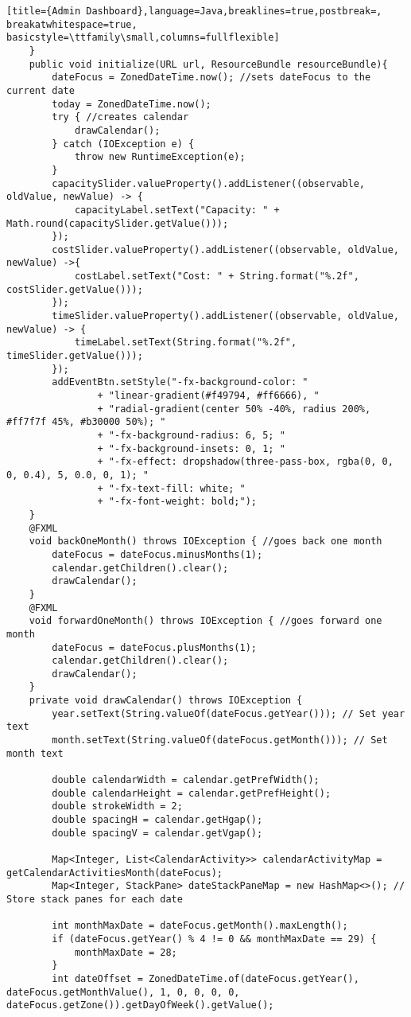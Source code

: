 \begin{lstlisting}[title={Admin Dashboard},language=Java,breaklines=true,postbreak=, breakatwhitespace=true, basicstyle=\ttfamily\small,columns=fullflexible]
    }
    public void initialize(URL url, ResourceBundle resourceBundle){
        dateFocus = ZonedDateTime.now(); //sets dateFocus to the current date
        today = ZonedDateTime.now();
        try { //creates calendar
            drawCalendar();
        } catch (IOException e) {
            throw new RuntimeException(e);
        }
        capacitySlider.valueProperty().addListener((observable, oldValue, newValue) -> {
            capacityLabel.setText("Capacity: " + Math.round(capacitySlider.getValue()));
        });
        costSlider.valueProperty().addListener((observable, oldValue, newValue) ->{
            costLabel.setText("Cost: " + String.format("%.2f", costSlider.getValue()));
        });
        timeSlider.valueProperty().addListener((observable, oldValue, newValue) -> {
            timeLabel.setText(String.format("%.2f", timeSlider.getValue()));
        });
        addEventBtn.setStyle("-fx-background-color: "
                + "linear-gradient(#f49794, #ff6666), "
                + "radial-gradient(center 50% -40%, radius 200%, #ff7f7f 45%, #b30000 50%); "
                + "-fx-background-radius: 6, 5; "
                + "-fx-background-insets: 0, 1; "
                + "-fx-effect: dropshadow(three-pass-box, rgba(0, 0, 0, 0.4), 5, 0.0, 0, 1); "
                + "-fx-text-fill: white; "
                + "-fx-font-weight: bold;");
    }
    @FXML
    void backOneMonth() throws IOException { //goes back one month
        dateFocus = dateFocus.minusMonths(1);
        calendar.getChildren().clear();
        drawCalendar();
    }
    @FXML
    void forwardOneMonth() throws IOException { //goes forward one month
        dateFocus = dateFocus.plusMonths(1);
        calendar.getChildren().clear();
        drawCalendar();
    }
    private void drawCalendar() throws IOException {
        year.setText(String.valueOf(dateFocus.getYear())); // Set year text
        month.setText(String.valueOf(dateFocus.getMonth())); // Set month text

        double calendarWidth = calendar.getPrefWidth();
        double calendarHeight = calendar.getPrefHeight();
        double strokeWidth = 2;
        double spacingH = calendar.getHgap();
        double spacingV = calendar.getVgap();

        Map<Integer, List<CalendarActivity>> calendarActivityMap = getCalendarActivitiesMonth(dateFocus);
        Map<Integer, StackPane> dateStackPaneMap = new HashMap<>(); // Store stack panes for each date

        int monthMaxDate = dateFocus.getMonth().maxLength();
        if (dateFocus.getYear() % 4 != 0 && monthMaxDate == 29) {
            monthMaxDate = 28;
        }
        int dateOffset = ZonedDateTime.of(dateFocus.getYear(), dateFocus.getMonthValue(), 1, 0, 0, 0, 0, dateFocus.getZone()).getDayOfWeek().getValue();


\end{lstlisting}
